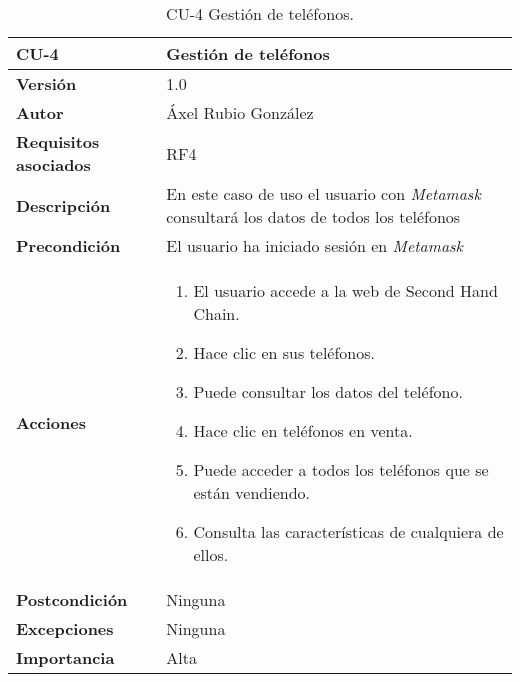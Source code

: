 \begin{table}[p]
	\centering
	\begin{tabularx}{\linewidth}{ p{} p{} }
		\toprule
		\textbf{CU-4}    & \textbf{Gestión de teléfonos}\\
		\toprule
		\textbf{Versión}              & 1.0    \\
		\textbf{Autor}                & Áxel Rubio González \\
		\textbf{Requisitos asociados} & RF4 \\
		\textbf{Descripción}          & En este caso de uso el usuario con \textit{Metamask} consultará los datos de todos los teléfonos  \\
		\textbf{Precondición}         & El usuario ha iniciado sesión en \textit{Metamask} \\
		\textbf{Acciones}             &
		\begin{enumerate}
			\def\labelenumi{\arabic{enumi}.}
			\tightlist
			\item El usuario accede a la web de Second Hand Chain.
			\item Hace clic en sus teléfonos.
                \item Puede consultar los datos del teléfono.
                \item Hace clic en teléfonos en venta.
                \item Puede acceder a todos los teléfonos que se están vendiendo.
                \item Consulta las características de cualquiera de ellos.
		\end{enumerate}\\
		\textbf{Postcondición}        & Ninguna \\
		\textbf{Excepciones}          & Ninguna \\
		\textbf{Importancia}          & Alta \\
		\bottomrule
	\end{tabularx}
	\caption{CU-4 Gestión de teléfonos.}
\end{table}


